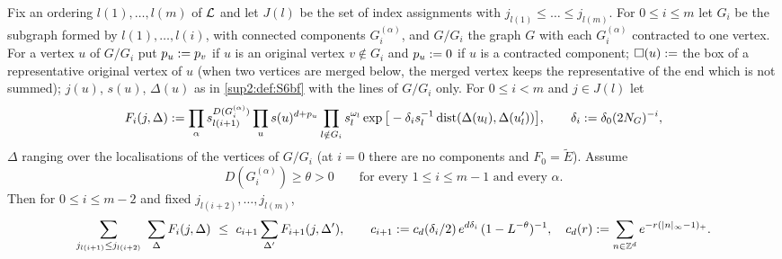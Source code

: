 \begin{lemma}\label{sup2:lem:S6step}
Fix an ordering $l(1),\dots,l(m)$ of $\mathcal L$ and let $J(l)$ be the set of index assignments with $j_{l(1)}\le\dots\le j_{l(m)}$. For $0\le i\le m$ let $G_i$ be the subgraph formed by $l(1),\dots,l(i)$, with connected components $G_i^{(\alpha)}$, and $G/G_i$ the graph $G$ with each $G_i^{(\alpha)}$ contracted to one vertex. For a vertex $u$ of $G/G_i$ put $p_u:= p_v$ if $u$ is an original vertex $v\notin G_i$ and $p_u:=0$ if $u$ is a contracted component; $\square(u):=$ the box of a representative original vertex of $u$ (when two vertices are merged below, the merged vertex keeps the representative of the end which is not summed); $j(u)$, $s(u)$, $\Delta(u)$ as in \cref{sup2:def:S6bf} with the lines of $G/G_i$ only. For $0\le i<m$ and $j\in J(l)$ let
\[
F_i(j,\Delta):=\prod_\alpha s_{l(i+1)}^{D(G_i^{(\alpha)})}\prod_us(u)^{d+p_u}\prod_{l\notin G_i}s_l^{\omega_l}\exp\big[-\delta_is_l^{-1}\operatorname{dist}(\Delta(u_l),\Delta(u'_l))\big],\qquad \delta_i:=\delta_0(2N_G)^{-i},
\]
$\Delta$ ranging over the localisations of the vertices of $G/G_i$ (at $i=0$ there are no components and $F_0=\tilde E$). Assume
\begin{equation}\label{sup2:eq:PD}
D(G_i^{(\alpha)})\ge\theta>0\qquad\text{for every }1\le i\le m-1\text{ and every }\alpha.\tag{PD}
\end{equation}
Then for $0\le i\le m-2$ and fixed $j_{l(i+2)},\dots,j_{l(m)}$,
\[
\sum_{j_{l(i+1)}\le j_{l(i+2)}}\ \sum_\Delta F_i(j,\Delta)\ \le\ c_{i+1}\sum_{\Delta'}F_{i+1}(j,\Delta'),\qquad c_{i+1}\defeq c_d(\delta_i/2)\,e^{d\delta_i}\,(1-L^{-\theta})^{-1},\quad c_d(r)\defeq\sum_{n\in\Z^d}e^{-r(|n|_\infty-1)_+}.
\]
\end{lemma}

